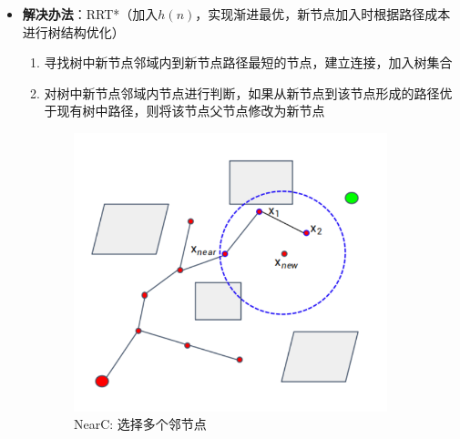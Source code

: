 \documentclass[../main.tex]{subfiles}
\begin{document}
\begin{enumerate}
\begin{enumerate}
\begin{itemize}
                    \item \textbf{解决办法}：RRT*（加入$h(n)$，实现渐进最优，新节点加入时根据路径成本进行树结构优化）
                        \begin{enumerate}
                            \item 寻找树中新节点邻域内到新节点路径最短的节点，建立连接，加入树集合
                            \item 对树中新节点邻域内节点进行判断，如果从新节点到该节点形成的路径优于现有树中路径，则将该节点父节点修改为新节点
                        \end{enumerate}
                \end{itemize}
        \end{enumerate}
        \begin{figure}[H]
                \centering
                \begin{subfigure}[b]{0.19\textwidth}
                    \includegraphics[width=\linewidth]{images/rrts/rrts1.png}
                    \caption{NearC: 选择多个邻节点}
                    \label{fig:rrts1}
                \end{subfigure}
                \begin{subfigure}[b]{0.19\textwidth}

\end{subfigure}
\end{figure}
\end{enumerate}
\end{document}
